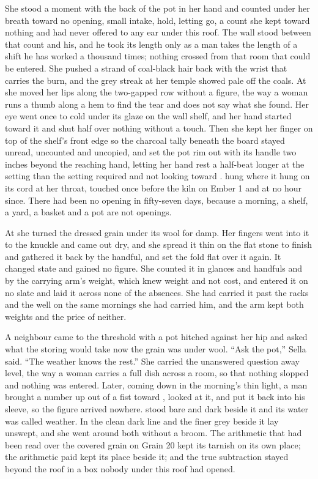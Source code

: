 She stood a moment with the back of the pot in her hand and counted under her breath toward no opening, small intake, hold, letting go, a count she kept toward nothing and had never offered to any ear under this roof. The wall stood between that count and his, and he took its length only as a man takes the length of a shift he has worked a thousand times; nothing crossed from that room that could be entered. She pushed a strand of coal-black hair back with the wrist that carries the burn, and the grey streak at her temple showed pale off the coals. At  she moved her lips along the two-gapped row without a figure, the way a woman runs a thumb along a hem to find the tear and does not say what she found. Her eye went once to  cold under its glaze on the wall shelf, and her hand started toward it and shut half over nothing without a touch. Then she kept her finger on top of the shelf's front edge so the charcoal tally beneath the board stayed unread, uncounted and uncopied, and set the pot rim out with its handle two inches beyond the reaching hand, letting her hand rest a half-beat longer at the setting than the setting required and not looking toward .  hung where it hung on its cord at her throat, touched once before the kiln on Ember 1 and at no hour since. There had been no opening in fifty-seven days, because a morning, a shelf, a yard, a basket and a pot are not openings.

At  she turned the dressed grain under its wool for damp. Her fingers went into it to the knuckle and came out dry, and she spread it thin on the flat stone to finish and gathered it back by the handful, and set the fold flat over it again. It changed state and gained no figure. She counted it in glances and handfuls and by the carrying arm's weight, which knew weight and not cost, and entered it on no slate and laid it across none of the absences. She had carried it past the racks and the well on the same mornings she had carried him, and the arm kept both weights and the price of neither.

A neighbour came to the threshold with a pot hitched against her hip and asked what the storing would take now the grain was under wool. “Ask the pot,” Sella said. “The weather knows the rest.” She carried the unanswered question away level, the way a woman carries a full dish across a room, so that nothing slopped and nothing was entered. Later, coming down  in the morning's thin light, a man brought a number up out of a fist toward , looked at it, and put it back into his sleeve, so the figure arrived nowhere.  stood bare and dark beside it and its water was called weather. In  the clean dark line and the finer grey beside it lay unswept, and she went around both without a broom. The arithmetic that had been read over the covered grain on Grain 20 kept its tarnish on its own place; the arithmetic paid kept its place beside it; and the true subtraction stayed beyond the roof in a box nobody under this roof had opened.

